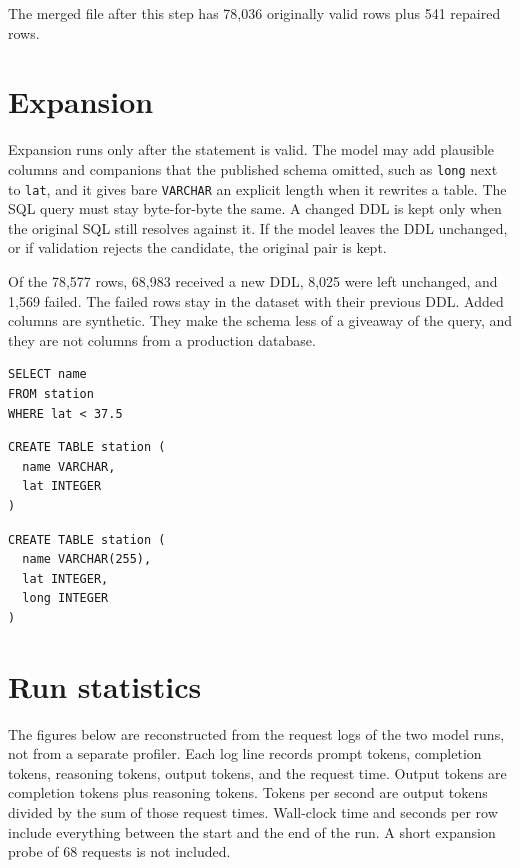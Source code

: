 \documentclass[11pt,a4paper]{article}
\begin{document}
The merged file after this step has 78{,}036 originally valid rows plus 541
repaired rows.

\section{Expansion}

Expansion runs only after the statement is valid. The model may add plausible
columns and companions that the published schema omitted, such as \texttt{long}
next to \texttt{lat}, and it gives bare \texttt{VARCHAR} an explicit length
when it rewrites a table. The SQL query must stay byte-for-byte the same. A
changed DDL is kept only when the original SQL still resolves against it. If
the model leaves the DDL unchanged, or if validation rejects the candidate,
the original pair is kept.

Of the 78{,}577 rows, 68{,}983 received a new DDL, 8{,}025 were left unchanged,
and 1{,}569 failed. The failed rows stay in the dataset with their previous
DDL. Added columns are synthetic. They make the schema less of a giveaway of
the query, and they are not columns from a production database.

\begin{lstlisting}[caption={SQL. Expansion is required to leave this statement unchanged.}]
SELECT name
FROM station
WHERE lat < 37.5
\end{lstlisting}

\begin{lstlisting}[caption={DDL before expansion. Only the columns used by the query are present.}]
CREATE TABLE station (
  name VARCHAR,
  lat INTEGER
)
\end{lstlisting}

\begin{lstlisting}[caption={DDL after expansion. A companion column and string lengths were added.}]
CREATE TABLE station (
  name VARCHAR(255),
  lat INTEGER,
  long INTEGER
)
\end{lstlisting}

\section{Run statistics}

The figures below are reconstructed from the request logs of the two model
runs, not from a separate profiler. Each log line records prompt tokens,
completion tokens, reasoning tokens, output tokens, and the request time.
Output tokens are completion tokens plus reasoning tokens. Tokens per second
are output tokens divided by the sum of those request times. Wall-clock time
and seconds per row include everything between the start and the end of the
run. A short expansion probe of 68 requests is not included.
\end{document}
